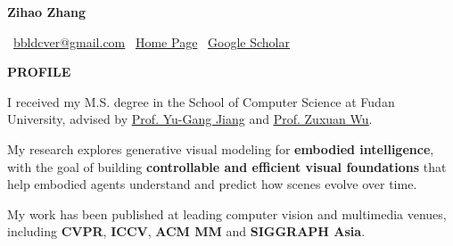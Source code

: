 \documentclass[10pt,a4paper]{article}
\newcommand{\Section}[1]{%
  \vspace{3.5pt}%
  {\color{Ink}\bfseries\fontsize{10}{12}\selectfont\MakeUppercase{#1}\par}%
  \vspace{2.5pt}%
}
\begin{document}
\color{Muted}

{\color{Ink}\bfseries\fontsize{25}{26}\selectfont Zihao Zhang\par}
\vspace{3pt}
{\fontsize{8.5}{11.5}\selectfont
\faEnvelope\ \href{mailto:bbldcver@gmail.com}{\textcolor{myblue}{bbldcver@gmail.com}}
\textperiodcentered{}
\faHome\ \href{https://bbldcver.github.io/}{\textcolor{myblue}{Home Page}}
\textperiodcentered{}
\faGoogle\ \href{https://scholar.google.com/citations?hl=zh-CN\&authuser=1\&user=\_7r2J74AAAAJ}{\textcolor{myblue}{Google Scholar}}\par
}

\Section{Profile}
{\color{Muted}\fontsize{8.5}{11.5}\selectfont
I received my M.S. degree in the School of Computer Science at Fudan University, advised by \href{https://scholar.google.com/citations?user=f3_FP8AAAAAJ\&hl=zh-CN\&authuser=1\&oi=ao}{\textcolor{myblue}{\underline{Prof. Yu-Gang Jiang}}} and \href{https://scholar.google.com/citations?user=7t12hVkAAAAJ\&hl=zh-CN\&authuser=1}{\textcolor{myblue}{\underline{Prof. Zuxuan Wu}}}.

\vspace{0.2em}
My research explores generative visual modeling for \textbf{embodied intelligence}, with the goal of building \textbf{controllable and efficient visual foundations} that help embodied agents understand and predict how scenes evolve over time.

\vspace{0.2em}
My work has been published at leading computer vision and multimedia venues, including \textbf{CVPR}, \textbf{ICCV}, \textbf{ACM MM} and \textbf{SIGGRAPH Asia}.\par
}
\vspace{5pt}
\end{document}
